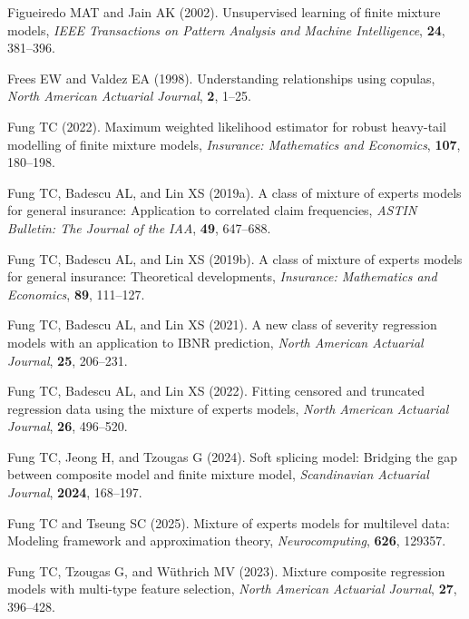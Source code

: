 \documentclass[eng]{csam}
\begin{document}
\begin{reference}
Figueiredo MAT and Jain AK (2002). Unsupervised learning of finite mixture models, {\em IEEE Transactions on Pattern Analysis and Machine Intelligence}, {\bf 24}, 381--396.

Frees EW and Valdez EA (1998). Understanding relationships using copulas, {\em North American Actuarial Journal}, {\bf 2}, 1--25.

Fung TC (2022). Maximum weighted likelihood estimator for robust heavy-tail modelling of finite mixture models, {\em Insurance: Mathematics and Economics}, {\bf 107}, 180--198.

Fung TC, Badescu AL, and Lin XS (2019a). A class of mixture of experts models for general insurance: Application to correlated claim frequencies, {\em ASTIN Bulletin: The Journal of the IAA}, {\bf 49}, 647--688.

Fung TC, Badescu AL, and Lin XS (2019b). A class of mixture of experts models for general insurance: Theoretical developments, {\em Insurance: Mathematics and Economics}, {\bf 89}, 111--127.

Fung TC, Badescu AL, and Lin XS (2021). A new class of severity regression models with an application to IBNR prediction, {\em North American Actuarial Journal}, {\bf 25}, 206--231.

Fung TC, Badescu AL, and Lin XS (2022). Fitting censored and truncated regression data using the mixture of experts models, {\em North American Actuarial Journal}, {\bf 26}, 496--520.

Fung TC, Jeong H, and Tzougas G (2024). Soft splicing model: Bridging the gap between composite model and finite mixture model, {\em Scandinavian Actuarial Journal}, {\bf 2024}, 168--197.

Fung TC and Tseung SC (2025). Mixture of experts models for multilevel data: Modeling framework and approximation theory, {\em Neurocomputing}, {\bf 626}, 129357.

Fung TC, Tzougas G, and W\"uthrich MV (2023). Mixture composite regression models with multi-type feature selection, {\em North American Actuarial Journal}, {\bf 27}, 396--428.


\end{reference}
\end{document}
